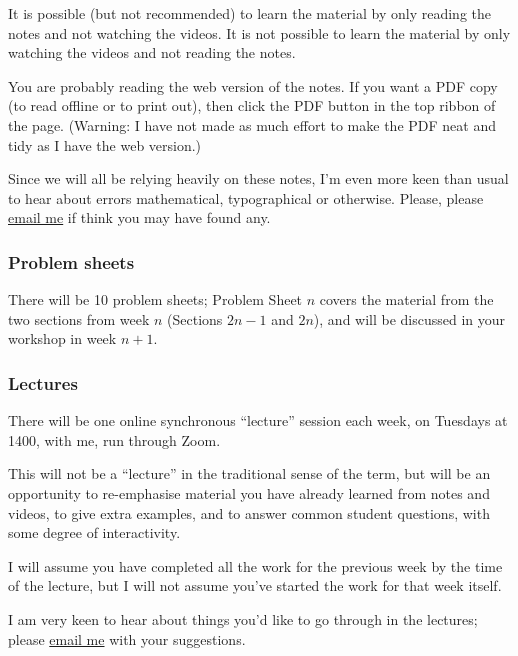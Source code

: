 \documentclass[
  a4paper,
]{article}
\theoremstyle{definition}
\theoremstyle{definition}
\theoremstyle{definition}
\theoremstyle{remark}
\begin{document}
It is possible (but not recommended) to learn the material by only reading the notes and not watching the videos. It is not possible to learn the material by only watching the videos and not reading the notes.

You are probably reading the web version of the notes. If you want a PDF copy (to read offline or to print out), then click the PDF button in the top ribbon of the page. (Warning: I have not made as much effort to make the PDF neat and tidy as I have the web version.)

Since we will all be relying heavily on these notes, I'm even more keen than usual to hear about errors mathematical, typographical or otherwise. Please, please \href{mailto:m.aldridge@leeds.ac.uk}{email me} if think you may have found any.

\hypertarget{problem-sheets}{%
\subsubsection*{Problem sheets}\label{problem-sheets}}

There will be 10 problem sheets; Problem Sheet \(n\) covers the material from the two sections from week \(n\) (Sections \(2n -1\) and \(2n\)), and will be discussed in your workshop in week \(n+1\).

\hypertarget{lectures}{%
\subsubsection*{Lectures}\label{lectures}}

There will be one online synchronous ``lecture'' session each week, on Tuesdays at 1400, with me, run through Zoom.

This will not be a ``lecture'' in the traditional sense of the term, but will be an opportunity to re-emphasise material you have already learned from notes and videos, to give extra examples, and to answer common student questions, with some degree of interactivity.

I will assume you have completed all the work for the previous week by the time of the lecture, but I will not assume you've started the work for that week itself.

I am very keen to hear about things you'd like to go through in the lectures; please \href{mailto:m.aldridge@leeds.ac.uk}{email me} with your suggestions.
\end{document}
